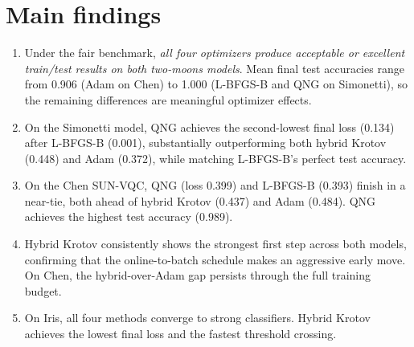 \documentclass[11pt]{article}
\begin{document}
\section*{Main findings}
\begin{enumerate}
\item Under the fair benchmark, \emph{all four optimizers produce acceptable or excellent train/test results on both two-moons models}. Mean final test accuracies range from 0.906 (Adam on Chen) to 1.000 (L-BFGS-B and QNG on Simonetti), so the remaining differences are meaningful optimizer effects.
\item On the Simonetti model, QNG achieves the second-lowest final loss (0.134) after L-BFGS-B (0.001), substantially outperforming both hybrid Krotov (0.448) and Adam (0.372), while matching L-BFGS-B's perfect test accuracy.
\item On the Chen SUN-VQC, QNG (loss 0.399) and L-BFGS-B (0.393) finish in a near-tie, both ahead of hybrid Krotov (0.437) and Adam (0.484). QNG achieves the highest test accuracy (0.989).
\item Hybrid Krotov consistently shows the strongest first step across both models, confirming that the online-to-batch schedule makes an aggressive early move. On Chen, the hybrid-over-Adam gap persists through the full training budget.
\item On Iris, all four methods converge to strong classifiers. Hybrid Krotov achieves the lowest final loss and the fastest threshold crossing.
\end{enumerate}
\end{document}
